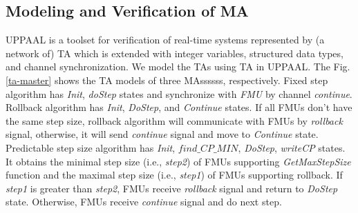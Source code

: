\subsection{Modeling and Verification of MA} 
UPPAAL is a toolset for verification of real-time systems represented by (a network of) TA which is extended with integer variables, structured data types, and channel synchronization. We model the TAs using TA in UPPAAL. The Fig.\ref{ta-master} shows the TA models of three MAssssss,  respectively. Fixed step algorithm has \emph{Init}, \emph{doStep} states and synchronize with \emph{FMU} by channel \emph{continue}. Rollback algorithm has \emph{Init}, \emph{DoStep}, and \emph{Continue} states. If all FMUs don't have the same step size, rollback algorithm will communicate with FMUs by \emph{rollback} signal, otherwise, it will send \emph{continue} signal and move to \emph{Continue} state. Predictable step size algorithm has \emph{Init}, $find \_ CP \_ MIN$, \emph{DoStep}, \emph{writeCP} states. It obtains the minimal step size (i.e., \emph{step2}) of FMUs supporting \emph{GetMaxStepSize} function and the maximal step size (i.e., \emph{step1}) of FMUs supporting rollback. If \emph{step1} is greater than \emph{step2}, FMUs receive \emph{rollback} signal and return to \emph{DoStep} state. Otherwise, FMUs receive \emph{continue} signal and do next step.  

\begin{figure}[htbp]
\end{figure}

